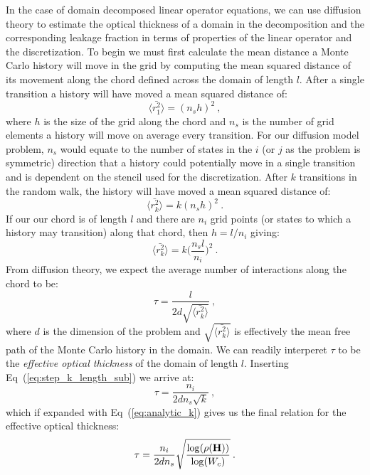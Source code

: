 \documentclass{mc2013}
\begin{document}
In the case of domain decomposed linear operator equations, we can use
diffusion theory to estimate the optical thickness of a domain in the
decomposition and the corresponding leakage fraction in terms of
properties of the linear operator and the discretization. To begin we
must first calculate the mean distance a Monte Carlo history will move
in the grid by computing the mean squared distance of its movement
along the chord defined across the domain of length $l$. After a
single transition a history will have moved a mean squared distance
of:
\begin{equation}
  \langle \bar{r_1^2} \rangle = (n_s h)^2\:,
  \label{eq:step_1_length}
\end{equation}
where $h$ is the size of the grid along the chord and $n_s$ is the
number of grid elements a history will move on average every
transition. For our diffusion model problem, $n_s$ would equate to the
number of states in the $i$ (or $j$ as the problem is symmetric)
direction that a history could potentially move in a single transition
and is dependent on the stencil used for the discretization. After $k$
transitions in the random walk, the history will have moved a mean
squared distance of:
\begin{equation}
  \langle \bar{r_k^2} \rangle = k (n_s h)^2\:.
  \label{eq:step_k_length}
\end{equation}
If our our chord is of length $l$ and there are $n_i$ grid points (or
states to which a history may transition) along that chord, then $h =
l / n_i$ giving:
\begin{equation}
  \langle \bar{r_k^2} \rangle = k \Bigg(\frac{n_s l}{n_i}\Bigg)^2\:.
  \label{eq:step_k_length_sub}
\end{equation}
From diffusion theory, we expect the average number of interactions
along the chord to be:
\begin{equation}
  \tau = \frac{l}{2 d \sqrt{\langle \bar{r_k^2} \rangle}}\:,
  \label{eq:optical_thickness_1}
\end{equation}
where $d$ is the dimension of the problem and $\sqrt{\langle
  \bar{r_k^2} \rangle}$ is effectively the mean free path of the Monte
Carlo history in the domain. We can readily interperet $\tau$ to be
the \textit{effective optical thickness} of the domain of length
$l$. Inserting Eq~(\ref{eq:step_k_length_sub}) we arrive at:
\begin{equation}
  \tau = \frac{n_i}{2 d n_s \sqrt{k}}\:,
  \label{eq:optical_thickness_2}
\end{equation}
which if expanded with Eq~(\ref{eq:analytic_k}) gives us the final
relation for the effective optical thickness:
\begin{equation}
  \tau = \frac{n_i}{2 d n_s}
  \sqrt{\frac{\log(\rho(\mathbf{H}))}{\log(W_c)}}\:.
  \label{eq:optical_thickness_3}
\end{equation}
\end{document}
